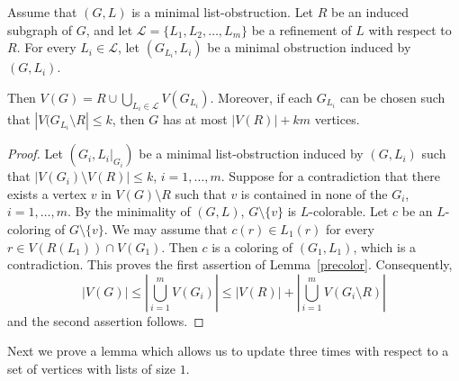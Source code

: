 \documentclass[11pt]{article}
\begin{document}
\begin{lemma}\label{precolor}
Assume that $(G,L)$ is a minimal list-obstruction. Let $R$ be an induced 
subgraph of $G$, and let $\mathcal{L}= \{L_1,L_2,\ldots,L_m\}$ be a refinement of $L$ with respect to $R$. 
For every $L_i \in \mathcal{L}$, let $(G_{L_i},L_i)$ be a minimal obstruction
induced by $(G,L_i)$.

Then  $V(G)=R \cup \bigcup_{L_i \in \mathcal{L}}V(G_{L_i})$.
Moreover, if each $G_{L_i}$ can be chosen such that 
$|V(G_{L_i} \setminus R| \leq k$, then $G$ has at most $|V(R)|+km$ vertices.
\end{lemma}
\begin{proof}
	Let $(G_i,L_i|_{G_i})$ be a minimal list-obstruction induced by $(G,L_i)$ such that $|V(G_i)\setminus V(R)| \leq k$, $i=1,\ldots,m$. 
	Suppose for a contradiction that there exists a vertex $v$ in 
$V(G)\setminus R$ such that $v$ is contained in none of the 
$G_i$, $i=1,\ldots,m$. 
	By the minimality of $(G,L)$, $G\setminus \{v\}$ is
	$L$-colorable. Let $c$ be an 
	$L$-coloring
	of $G \setminus \{v\}$.
	We may assume that $c(r) \in L_1(r)$ for every $r \in V(R(L_1))\cap V(G_1)$. 
	Then $c$ is a coloring of $(G_1,L_1)$, which is a contradiction. 
This proves the first assertion of Lemma~\ref{precolor}.
	Consequently,   $$|V(G)| \le |\bigcup_{i=1}^m V(G_i)| \le |V(R)|+|\bigcup_{i=1}^m V(G_i\setminus R)|$$ and the second assertion follows.


\end{proof}

Next we prove a lemma which allows us to update three times with respect to a set of vertices with lists of size $1$. 
\end{document}
